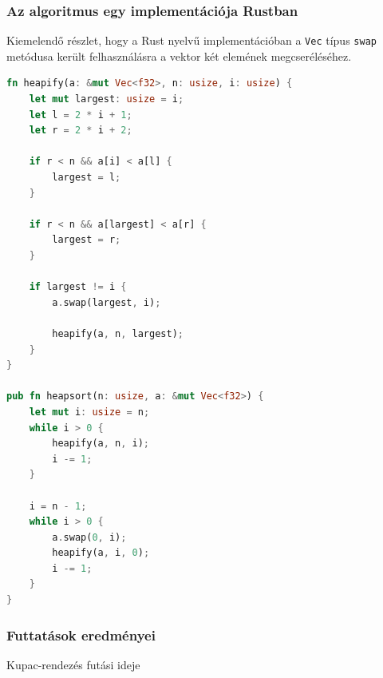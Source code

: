 \subsubsection{Az algoritmus egy implementációja Rustban}
Kiemelendő részlet, hogy a Rust nyelvű implementációban a \lstinline{Vec} típus \lstinline{swap} metódusa került felhasználásra a vektor két elemének megcseréléséhez.
\begin{lstlisting}[language=Rust]
fn heapify(a: &mut Vec<f32>, n: usize, i: usize) {
    let mut largest: usize = i;
    let l = 2 * i + 1;
    let r = 2 * i + 2;

    if r < n && a[i] < a[l] {
        largest = l;
    }

    if r < n && a[largest] < a[r] {
        largest = r;
    }

    if largest != i {
        a.swap(largest, i);

        heapify(a, n, largest);
    }
}

pub fn heapsort(n: usize, a: &mut Vec<f32>) {
    let mut i: usize = n;
    while i > 0 {
        heapify(a, n, i);
        i -= 1;
    }

    i = n - 1;
    while i > 0 {
        a.swap(0, i);
        heapify(a, i, 0);
        i -= 1;
    }
}
\end{lstlisting}
\subsubsection{Futtatások eredményei}
Kupac-rendezés futási ideje

